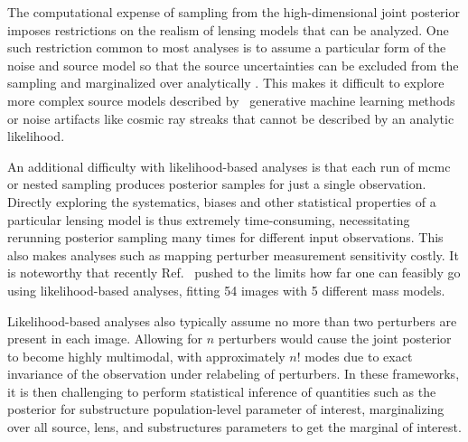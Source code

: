 The computational expense of sampling from the high-dimensional joint posterior imposes restrictions on the realism of lensing models that can be analyzed. One such restriction common to most analyses is to  assume a particular form of the noise and source model so that the source uncertainties can be excluded from the sampling and marginalized over analytically \cite{Hezaveh:2016ltk,Vegetti:2008eg,Vegetti:2009cz,Vegetti:2010wa,Vegetti:2012mc}. This makes it difficult to explore more complex source models described by \eg~generative machine learning methods or noise artifacts like cosmic ray streaks that cannot be described by an analytic likelihood.

An additional difficulty with likelihood-based analyses is that each run of \gls*{mcmc} or nested sampling produces posterior samples for just a single observation. Directly exploring the systematics, biases and other statistical properties of a particular lensing model is thus extremely time-consuming, necessitating rerunning posterior sampling many times for different input observations. This also makes analyses such as mapping perturber measurement sensitivity costly. It is noteworthy that recently Ref.~\cite{Nightingale:2022bhh} pushed to the limits how far one can feasibly go using likelihood-based analyses, fitting 54 images with 5 different mass models.

Likelihood-based analyses also typically assume no more than two perturbers are present in each image. Allowing for $n$ perturbers would cause the joint posterior to become highly multimodal, with approximately $n!$ modes due to exact invariance of the observation under relabeling of perturbers. In these frameworks, it is then challenging to perform statistical inference of quantities such as the posterior for substructure population-level parameter of interest, marginalizing over all source, lens, and substructures parameters to get the marginal of interest.



